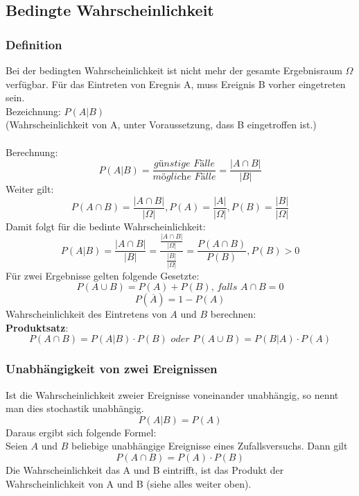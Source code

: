 \documentclass[12pt,a4paper]{article} %
\begin{document}
\subsection{Bedingte Wahrscheinlichkeit}
\subsubsection{Definition}
Bei der bedingten Wahrscheinlichkeit ist nicht mehr der gesamte Ergebnisraum $\Omega$ verfügbar. Für das Eintreten von Eregnis A, muss Ereignis B vorher eingetreten sein.\\Bezeichnung: $P(A|B)$\\ (Wahrscheinlichkeit von A, unter Voraussetzung, dass B eingetroffen ist.)\\\\
Berechnung:
$$P(A|B) = \frac{\textit{günstige Fälle}}{\textit{mögliche Fälle}} = \frac{|A \cap B|}{|B|}$$
Weiter gilt:
$$P(A\cap B) = \frac{|A\cap B|}{|\Omega|}, P(A) = \frac{|A|}{|\Omega|}, P(B) = \frac{|B|}{|\Omega|}$$
Damit folgt für die bedinte Wahrscheinlichkeit:
$$P(A|B) = \frac{|A\cap B|}{|B|} = \frac{\frac{|A\cap B|}{|\Omega|}}{\frac{|B|}{|\Omega|}}=\frac{P(A\cap B)}{P(B)}, P(B)>0$$
Für zwei Ergebnisse gelten folgende Gesetzte:
$$P(A\cup B) = P(A) + P(B)\textit{, falls } A\cap B = 0$$
$$P(\overline{A})= 1-P(A)$$  
Wahrscheinlichkeit des Eintretens von $A$ und $B$ berechnen:\\
\textbf{Produktsatz}:
$$P(A\cap B) = P(A|B)\cdot P(B)\textit{ oder } P(A\cup B) = P(B|A) \cdot P(A)$$

\subsubsection{Unabhängigkeit von zwei Ereignissen}
Ist die Wahrscheinlichkeit zweier Ereignisse voneinander unabhängig, so nennt man dies stochastik unabhängig.
$$P(A|B) = P(A)$$
Daraus ergibt sich folgende Formel:\\
Seien $A$ und $B$ beliebige unabhängige Ereignisse eines Zufallsversuchs. Dann gilt
$$P(A\cap B) = P(A) \cdot P(B)$$
Die Wahrscheinlichkeit das A und B eintrifft, ist das Produkt der Wahrscheinlichkeit von A und B (siehe alles weiter oben).
\end{document}
